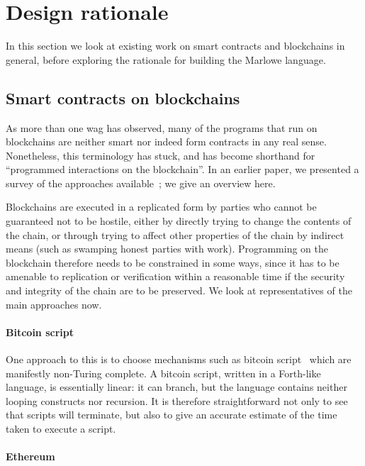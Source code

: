 \documentclass[runningheads]{llncs}
\begin{document}
\section{Design rationale}
\label{section:design}

\medskip
\noindent
In this section we look at existing work on smart contracts and blockchains in general, before exploring the rationale 
for building the Marlowe language.

\subsection{Smart contracts on blockchains}

As more than one wag has observed, many of the programs that run on blockchains are neither smart nor indeed form 
contracts in any real sense. Nonetheless, this terminology has stuck, and has become shorthand for ``programmed 
interactions on the blockchain''. In an earlier paper, we presented a survey of the approaches 
available~\cite{cryptoeprint:2016:1156}; we give an overview here.

Blockchains are executed in a replicated form by parties who cannot be guaranteed not to be hostile, either by directly 
trying to change the contents of the chain, or through trying to affect other properties of the chain by indirect means 
(such as swamping honest parties with work). Programming on the blockchain therefore needs to be constrained in some 
ways, since it has to be amenable to replication or verification within a reasonable time if the security and integrity 
of the chain are to be preserved. We look at representatives of the main approaches now.

\paragraph{Bitcoin script}

One approach to this is to choose mechanisms such as bitcoin script~\cite{BitcoinWikiScript} which are manifestly 
non-Turing complete. A bitcoin script, written in a Forth-like language, is essentially linear: it can branch, but the 
language contains neither looping constructs nor recursion. It is therefore straightforward not only to see that scripts 
will terminate, but also to give an accurate estimate of the time taken to execute a script. 

\paragraph{Ethereum}
\end{document}
